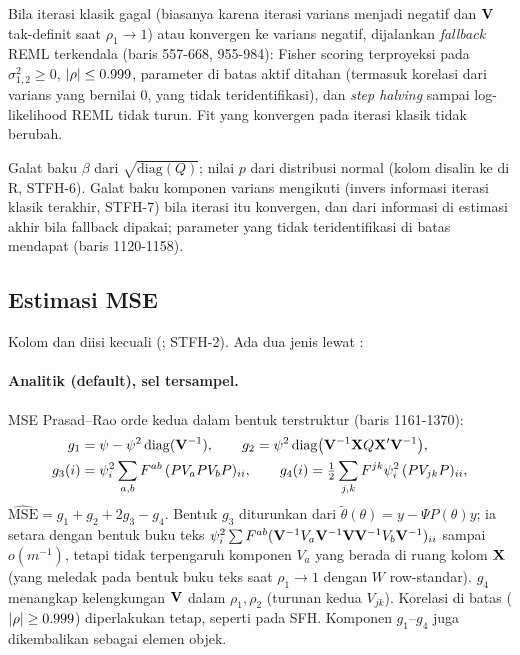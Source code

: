 Bila iterasi klasik gagal (biasanya karena iterasi varians menjadi negatif
dan $\mathbf{V}$ tak-definit saat $\rho_1\to1$) atau konvergen ke varians negatif,
dijalankan \emph{fallback} REML terkendala 
(baris 557-668, 955-984): Fisher scoring terproyeksi pada $\sigma^2_{1,2}\ge0$,
$\left|\rho\right|\le0.999$, parameter di batas aktif ditahan (termasuk korelasi dari
varians yang bernilai $0$, yang tidak teridentifikasi), dan \emph{step
halving} sampai log-likelihood REML tidak turun. Fit yang konvergen pada
iterasi klasik tidak berubah.

Galat baku $\beta$ dari $\sqrt{\mathrm{diag}(Q)}$; nilai $p$ dari distribusi
normal (kolom  disalin ke  di R, STFH-6). Galat
baku komponen varians mengikuti  (invers informasi
iterasi klasik terakhir, STFH-7) bila iterasi itu konvergen, dan dari
informasi di estimasi akhir bila fallback dipakai; parameter yang tidak
teridentifikasi di batas mendapat  (baris 1120-1158).

\subsection{Estimasi MSE}\label{sec:stfh-mse}

Kolom  dan  diisi  kecuali
 (; STFH-2). Ada dua
jenis lewat :

\paragraph{Analitik (default), sel tersampel.} MSE Prasad--Rao orde kedua
\citep{marhuenda2013small} dalam bentuk terstruktur (baris 1161-1370):
\begin{align}
  g_1&=\psi-\psi^2\operatorname{diag}(\mathbf{V}^{-1}),\qquad
  g_2=\psi^2\operatorname{diag}\bigl(\mathbf{V}^{-1}\mathbf{X} Q\mathbf{X}'\mathbf{V}^{-1}\bigr),
  \label{eq:stfh-g12}\\
  g_3(i)&=\psi_i^2\sum_{a,b}F^{ab}\,(PV_aPV_bP)_{ii},\qquad
  g_4(i)=\tfrac12\sum_{j,k}F^{jk}\psi_i^2\,(PV_{jk}P)_{ii},
  \label{eq:stfh-g34}
\end{align}
$\widehat{\mathrm{MSE}}=g_1+g_2+2g_3-g_4$. Bentuk $g_3$ diturunkan dari
$\tilde\theta(\theta)=y-\Psi P(\theta)y$; ia setara dengan bentuk buku teks
$\psi_i^2\sum F^{ab}(\mathbf{V}^{-1}V_a\mathbf{V}^{-1}\mathbf{V}\mathbf{V}^{-1}V_b\mathbf{V}^{-1})_{ii}$ sampai
$o(m^{-1})$, tetapi tidak terpengaruh komponen $V_a$ yang berada di ruang
kolom $\mathbf{X}$ (yang meledak pada bentuk buku teks saat $\rho_1\to1$ dengan $W$
row-standar). $g_4$ menangkap kelengkungan $\mathbf{V}$ dalam $\rho_1,\rho_2$ (turunan
kedua $V_{jk}$). Korelasi di batas ($\left|\rho\right|\ge0.999$) diperlakukan tetap,
seperti pada SFH. Komponen $g_1$--$g_4$ juga dikembalikan sebagai elemen
objek.

